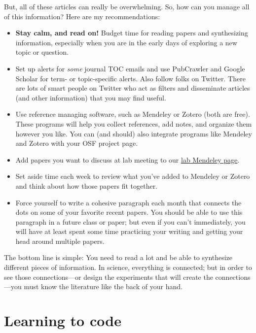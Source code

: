 \documentclass[letterpaper,12pt,oneside]{memoir}
\begin{document}
But, all of these articles can really be overwhelming. So, how can you manage all of this information? Here are my recommendations:

\begin{itemize}
\item \textbf{Stay calm, and read on!} Budget time for reading papers and synthesizing information, especially when you are in the early days of exploring a new topic or question. 
\item Set up alerts for \textit{some} journal TOC emails and use PubCrawler and Google Scholar for term- or topic-specific alerts. Also follow folks on Twitter. There are lots of smart people on Twitter who act as filters and disseminate articles (and other information) that you may find useful.
\item Use reference managing software, such as Mendeley or Zotero (both are free). These programs will help you collect references, add notes, and organize them however you like. You can (and should) also integrate programs like Mendeley and Zotero with your OSF project page.
\item Add papers you want to discuss at lab meeting to our \href{https://www.mendeley.com/community/smith-lab-meetings/}{lab Mendeley page}. 
\item Set aside time each week to review what you've added to Mendeley or Zotero and think about how those papers fit together.
\item Force yourself to write a cohesive paragraph each month that connects the dots on some of your favorite recent papers. You should be able to use this paragraph in a future class or paper; but even if you can't immediately, you will have at least spent some time practicing your writing and getting your head around multiple papers.
\end{itemize}

\begin{shaded}
\noindent The bottom line is simple: You need to read a lot and be able to synthesize different pieces of information. In science, everything is connected; but in order to see those connections---or design the experiments that will create the connections---you must know the literature like the back of your hand.
\end{shaded}


\section{Learning to code}
\label{sec:coding}
\end{document}
